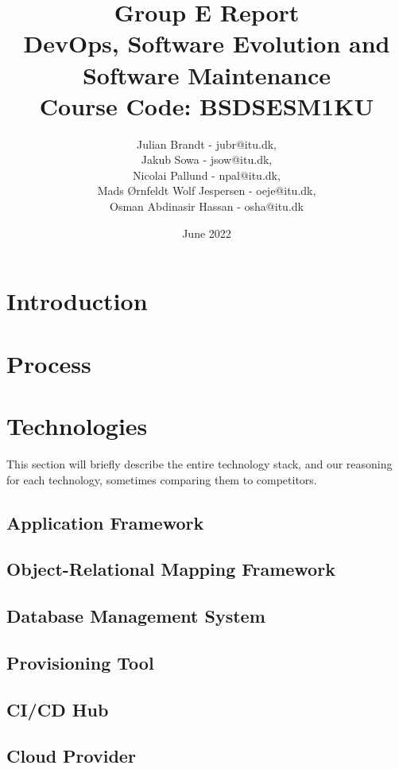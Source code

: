 \documentclass{article}
\title{Group E Report \\
    \Large DevOps, Software Evolution and Software Maintenance \\
    Course Code: BSDSESM1KU}
\author{Julian Brandt - jubr@itu.dk,\\
        Jakub Sowa - jsow@itu.dk,\\ 
        Nicolai Pallund - npal@itu.dk,\\ 
        Mads Ørnfeldt Wolf Jespersen - oeje@itu.dk,\\ 
        Osman Abdinasir Hassan - osha@itu.dk}
\date{June 2022}
\begin{document}
\maketitle

\newpage
\tableofcontents
\newpage

\section{Introduction}


\section{Process}


\section{Technologies}
This section will briefly describe the entire technology stack, and our reasoning for each technology, sometimes comparing them to competitors.

\subsection{Application Framework}


\subsection{Object-Relational Mapping Framework}


\subsection{Database Management System}


\subsection{Provisioning Tool}


\subsection{CI/CD Hub} \label{ci_cd_hub}




\subsection{Cloud Provider} \label{digitalocean}

\end{document}

